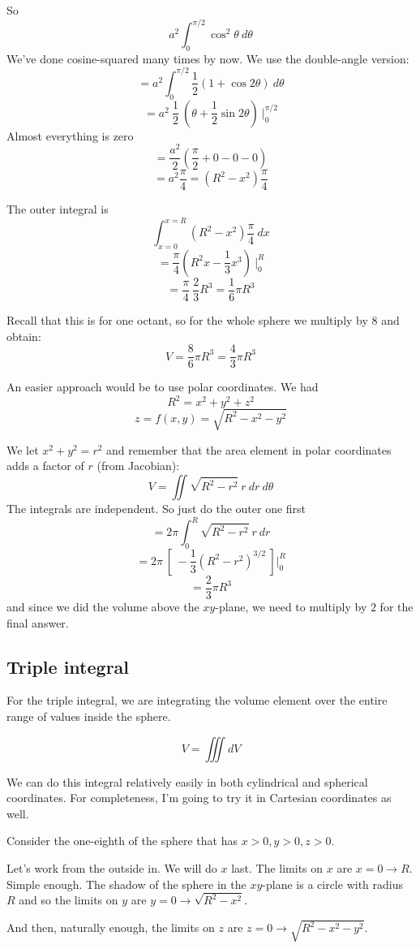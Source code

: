 \documentclass[11pt, oneside]{article}
\begin{document}
So
\[ a^2 \int_0^{\pi/2} \cos^2 \theta \ d \theta \]
We've done cosine-squared many times by now.  We use the double-angle version:
\[ = a^2 \int_0^{\pi/2} \frac{1}{2}(1 + \cos 2 \theta) \ d \theta \]
\[ = a^2 \ \frac{1}{2} \ (\theta + \frac{1}{2} \sin 2 \theta) \ \bigg |_0^{\pi/2} \]
Almost everything is zero
\[ = \frac{a^2}{2} (\frac{\pi}{2} + 0 - 0 - 0) \]
\[ = a^2 \frac{\pi}{4} = (R^2-x^2) \frac{\pi}{4} \]

The outer integral is
\[ \int_{x=0}^{x=R} (R^2-x^2) \frac{\pi}{4} \ dx \]
\[ = \frac{\pi}{4} (R^2x - \frac{1}{3}x^3) \ \bigg |_0^R \]
\[ = \frac{\pi}{4} \ \frac{2}{3}R^3 = \frac{1}{6}\pi R^3 \]

Recall that this is for one octant, so for the whole sphere we multiply by $8$ and obtain:
\[ V = \frac{8}{6}\pi R^3 = \frac{4}{3}\pi R^3 \]

An easier approach would be to use polar coordinates.  We had
\[ R^2 = x^2 + y^2 + z^2 \]
\[ z = f(x,y) = \sqrt{R^2 - x^2 - y^2} \]

We let $x^2 + y^2 = r^2$ and remember that the area element in polar coordinates adds a factor of $r$ (from Jacobian):
\[ V = \iint \sqrt{R^2 - r^2} \ r \ dr \ d \theta \]
The integrals are independent.  So just do the outer one first
\[ = 2 \pi \int_0^R  \sqrt{R^2 - r^2} \ r \ dr  \]
\[ = 2 \pi \ [ \ - \frac{1}{3} (R^2 - r^2)^{3/2} \ ] \bigg |_0^R \]
\[ = \frac{2}{3} \pi R^3 \]
and since we did the volume above the $xy$-plane, we need to multiply by $2$ for the final answer.

\subsection*{Triple integral}
For the triple integral, we are integrating the volume element over the entire range of values inside the sphere.

\[ V = \iiint dV \]

We can do this integral relatively easily in both cylindrical and spherical coordinates.  For completeness, I'm going to try it in Cartesian coordinates as well.

Consider the one-eighth of the sphere that has $x>0,y>0,z>0$.

Let's work from the outside in.  We will do $x$ last.  The limits on $x$ are $x=0 \rightarrow R$.  Simple enough.  The shadow of the sphere in the $xy$-plane is a circle with radius $R$ and so the limits on $y$ are $y=0 \rightarrow \sqrt{R^2-x^2}$.

And then, naturally enough, the limits on $z$ are $z=0 \rightarrow \sqrt{R^2 - x^2 - y^2}$.
\end{document}
